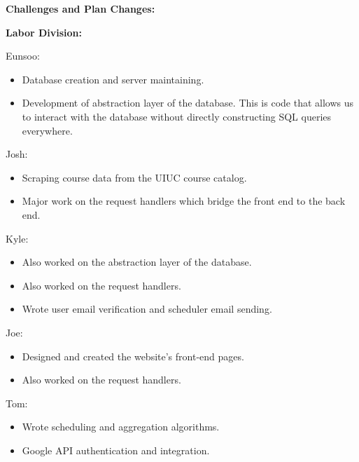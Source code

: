 \documentclass{article}
\begin{document}
{\bf Challenges and Plan Changes:}

\pagebreak
{\bf Labor Division:}

Eunsoo:
\begin{itemize}
\item Database creation and server maintaining.
\item Development of abstraction layer of the database. This is code that allows us to interact with the database without directly constructing SQL queries everywhere.
\end{itemize}
Josh:
\begin{itemize}
\item Scraping course data from the UIUC course catalog.
\item Major work on the request handlers which bridge the front end to the back end.
\end{itemize}
Kyle:
\begin{itemize}
\item Also worked on the abstraction layer of the database.
\item Also worked on the request handlers.
\item Wrote user email verification and scheduler email sending.
\end{itemize}
Joe:
\begin{itemize}
\item Designed and created the website's front-end pages.
\item Also worked on the request handlers.
\end{itemize}
Tom:
\begin{itemize}
\item Wrote scheduling and aggregation algorithms.
\item Google API authentication and integration.
\end{itemize}
\end{document}
